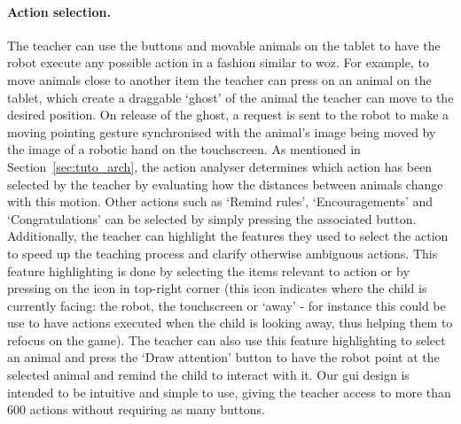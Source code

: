 \paragraph{Action selection.} 
The teacher can use the buttons and movable animals on the tablet to have the robot execute any possible action in a fashion similar to \gls{woz}. For example, to move animals close to another item the teacher can press on an animal on the tablet, which create a draggable `ghost' of the animal the teacher can move to the desired position. On release of the ghost, a request is sent to the robot to make a moving pointing gesture synchronised with the animal's image being moved by the image of a robotic hand on the touchscreen.
As mentioned in Section~\ref{sec:tuto_arch}, the action analyser determines which action has been selected by the teacher by evaluating how the distances between animals change with this motion. Other actions such as `Remind rules', `Encouragements' and  `Congratulations' can be selected by simply pressing the associated button.
Additionally, the teacher can highlight the features they used to select the action to speed up the teaching process and clarify otherwise ambiguous actions. This feature highlighting is done by selecting the items relevant to action or by pressing on the icon in top-right corner (this icon indicates where the child is currently facing: the robot, the touchscreen or `away' - for instance this could be use to have actions executed when the child is looking away, thus helping them to refocus on the game).
The teacher can also use this feature highlighting to select an animal and press the `Draw attention' button to have the robot point at the selected animal and remind the child to interact with it.
Our \gls{gui} design is intended to be intuitive and simple to use, giving the teacher access to more than 600 actions without requiring as many buttons. 


